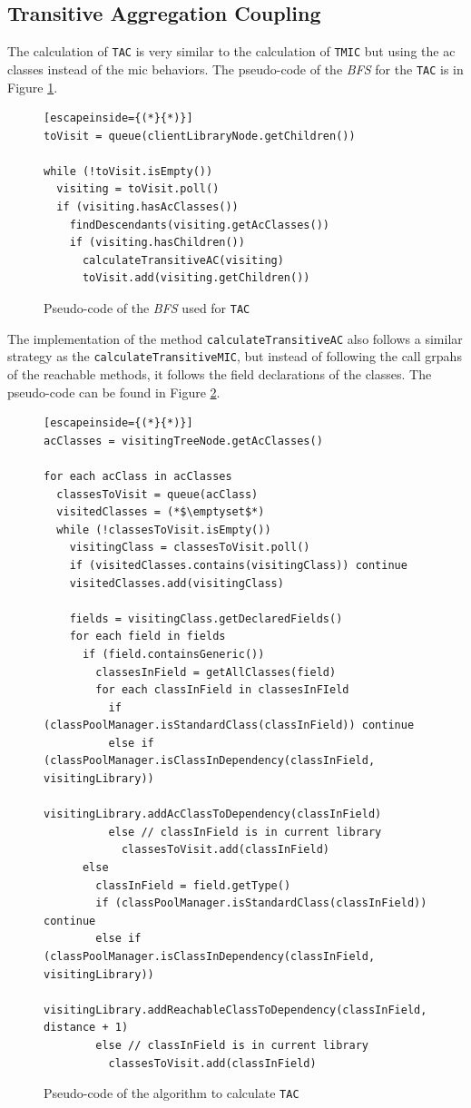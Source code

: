 \subsection{Transitive Aggregation Coupling}
The calculation of \texttt{TAC} is very similar to the calculation of \texttt{TMIC} but using the ac classes instead of the mic behaviors. The pseudo-code of the \textit{BFS} for the \texttt{TAC} is in Figure \ref{fig:tree-traversing-tac}.

\begin{figure}[ht!]
\begin{lstlisting}[escapeinside={(*}{*)}]
toVisit = queue(clientLibraryNode.getChildren())

while (!toVisit.isEmpty())
  visiting = toVisit.poll()
  if (visiting.hasAcClasses())
    findDescendants(visiting.getAcClasses())
    if (visiting.hasChildren())
      calculateTransitiveAC(visiting)
      toVisit.add(visiting.getChildren())
\end{lstlisting}
\caption{Pseudo-code of the \textit{BFS} used for \texttt{TAC}}
\label{fig:tree-traversing-tac}
\end{figure}

The implementation of the method \texttt{calculateTransitiveAC} also follows a similar strategy as the \texttt{calculateTransitiveMIC}, but instead of following the call grpahs of the reachable methods, it follows the field declarations of the classes. The pseudo-code can be found in Figure \ref{fig:calculate-tac}.

\begin{figure}[ht!]
\begin{lstlisting}[escapeinside={(*}{*)}]
acClasses = visitingTreeNode.getAcClasses()

for each acClass in acClasses
  classesToVisit = queue(acClass)
  visitedClasses = (*$\emptyset$*)
  while (!classesToVisit.isEmpty())
    visitingClass = classesToVisit.poll()
    if (visitedClasses.contains(visitingClass)) continue
    visitedClasses.add(visitingClass)

    fields = visitingClass.getDeclaredFields()
    for each field in fields
      if (field.containsGeneric())
        classesInField = getAllClasses(field)
        for each classInField in classesInFIeld
          if (classPoolManager.isStandardClass(classInField)) continue
          else if (classPoolManager.isClassInDependency(classInField, visitingLibrary))
            visitingLibrary.addAcClassToDependency(classInField)
          else // classInField is in current library
            classesToVisit.add(classInField)
      else
        classInField = field.getType()
        if (classPoolManager.isStandardClass(classInField)) continue
        else if (classPoolManager.isClassInDependency(classInField, visitingLibrary))
          visitingLibrary.addReachableClassToDependency(classInField, distance + 1)
        else // classInField is in current library
          classesToVisit.add(classInField)
\end{lstlisting}
\caption{Pseudo-code of the algorithm to calculate \texttt{TAC}}
\label{fig:calculate-tac}
\end{figure}


